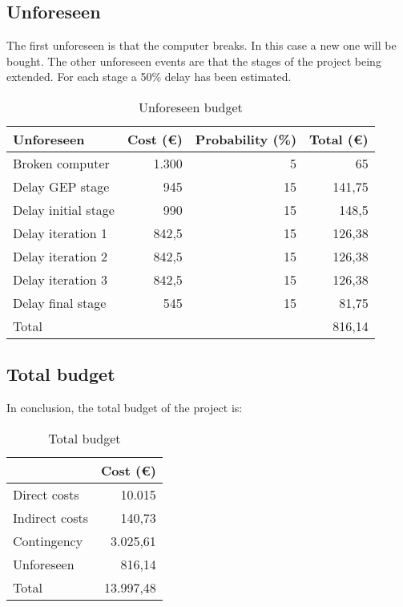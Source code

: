 \subsection{Unforeseen}
The first unforeseen is that the computer breaks. In this case a new one will be bought. The other unforeseen events are that the stages of the project being extended. For each stage a 50\% delay has been estimated.
\begin{table}[h!]
	\centering
	\begin{tabular}{|l|r|r|r|}
		\hline
		Unforeseen & \multicolumn{1}{l|}{Cost (€)} & \multicolumn{1}{l|}{Probability (\%)} & \multicolumn{1}{l|}{Total (€)} \\ \hline
		Broken computer & 1.300 & 5 & 65 \\ \hline
		Delay GEP stage & 945 & 15 & 141,75\\ \hline
		Delay initial stage & 990 & 15 & 148,5\\ \hline
		Delay iteration 1 & 842,5 & 15 & 126,38\\ \hline
		Delay iteration 2 & 842,5 & 15 & 126,38\\ \hline
		Delay iteration 3 & 842,5 & 15 & 126,38\\ \hline
		Delay final stage & 545 & 15 & 81,75\\ \hline\hline
		Total & \multicolumn{3}{r|}{816,14} \\ \hline
	\end{tabular}
	\caption{Unforeseen budget}
	\label{Unforeseen}
\end{table}

\subsection{Total budget}
In conclusion, the total budget of the project is:
\begin{table}[h!]
	\centering
	\begin{tabular}{l|r|}
		\cline{2-2}
		& \multicolumn{1}{l|}{Cost (€)} \\ \hline
		\multicolumn{1}{|l|}{Direct costs} & 10.015\\ \hline
		\multicolumn{1}{|l|}{Indirect costs}& 140,73\\ \hline
		\multicolumn{1}{|l|}{Contingency} & 3.025,61\\ \hline
		\multicolumn{1}{|l|}{Unforeseen} & 816,14\\ \hline\hline
		\multicolumn{1}{|l|}{Total} & 13.997,48\\ \hline
	\end{tabular}
	\caption{Total budget}
	\label{TotalBudget}
\end{table}
